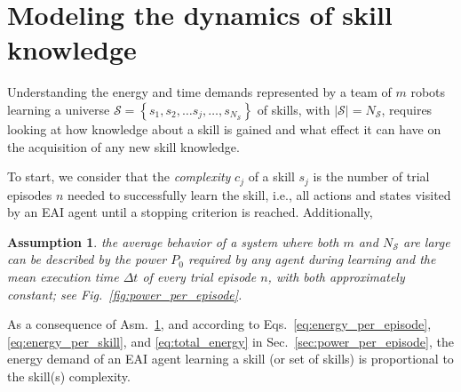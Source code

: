 \documentclass[12pt]{article}
\renewcommand{\emph}[1]{\textit{#1}}
\newtheorem{assumption}{Assumption}
\begin{document}
\section*{Modeling the dynamics of skill knowledge}\label{sec:knowledge_dynamics_model}
Understanding the energy and time demands represented by a team of $m$ robots learning a universe $\mathcal{S}=\left\lbrace s_1,s_2,\ldots s_j,\ldots, s_{N_\mathcal{S}}\right\rbrace$ of skills, with $|\mathcal{S}| = N_\mathcal{S}$, requires looking at how knowledge about a skill is gained and what effect it can have on the acquisition of any new skill knowledge. 

To start, we consider that the \emph{complexity} $c_j$ of a skill $ s_j $ is the number of trial episodes $n$ needed to successfully learn the skill, i.e., all actions and states visited by an EAI agent until a stopping criterion is reached. Additionally, %
\begin{tcolorbox}
	\begin{assumption}\label{assumption:power_and_episode_time}
		the average behavior of a system where both $m$ and $N_\mathcal{S}$ are large can be described by the power $P_0$ required by any agent during learning and the mean execution time $\Delta t$ of every trial episode $n$, with both approximately constant; see Fig.~\ref{fig:power_per_episode}.
	\end{assumption}
\end{tcolorbox}
\noindent As a consequence of Asm.~\ref{assumption:power_and_episode_time}, and according to Eqs.~\eqref{eq:energy_per_episode},\eqref{eq:energy_per_skill}, and \eqref{eq:total_energy} in Sec.~\ref{sec:power_per_episode}, the energy demand of an EAI agent learning a skill (or set of skills) is proportional to the skill(s) complexity.

\end{document}
